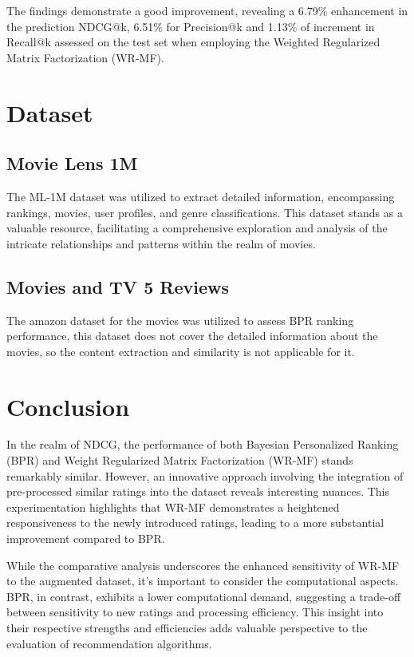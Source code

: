 \documentclass[journal]{IEEEtran}
\begin{document}
The findings demonstrate a good improvement, revealing a 6.79\% enhancement in the prediction NDCG@k, 6.51\% for Precision@k and 1.13\% of
increment in Recall@k assessed on the test set when employing the Weighted Regularized Matrix Factorization (WR-MF). 

\section{Dataset}

\subsection*{Movie Lens 1M}
The ML-1M dataset was utilized to extract detailed information, encompassing rankings, movies, user profiles, and genre classifications. 
This dataset stands as a valuable resource, facilitating a comprehensive exploration and analysis of the intricate relationships and 
patterns within the realm of movies.

\subsection*{Movies and TV 5 Reviews}
The amazon dataset for the movies was utilized to assess BPR ranking performance, this dataset does not cover the detailed information
about the movies, so the content extraction and similarity is not applicable for it.

\section{Conclusion}
In the realm of NDCG, the performance of both Bayesian Personalized Ranking (BPR) and Weight Regularized Matrix Factorization (WR-MF) 
stands remarkably similar. However, an innovative approach involving the integration of pre-processed similar ratings into the 
dataset reveals interesting nuances. This experimentation highlights that WR-MF demonstrates a heightened responsiveness to the 
newly introduced ratings, leading to a more substantial improvement compared to BPR.

While the comparative analysis underscores the enhanced sensitivity of WR-MF to the augmented dataset, it's important to consider 
the computational aspects. BPR, in contrast, exhibits a lower computational demand, suggesting a trade-off between sensitivity to 
new ratings and processing efficiency. This insight into their respective strengths and efficiencies adds valuable perspective to 
the evaluation of recommendation algorithms.
\end{document}
